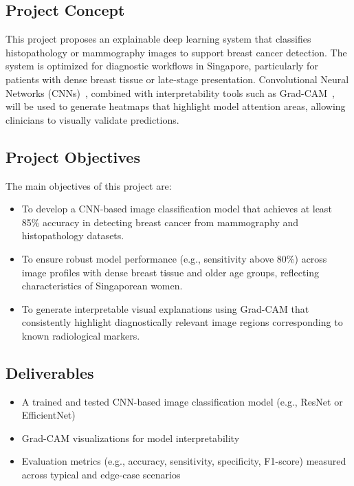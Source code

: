 \documentclass[12pt]{article}
\begin{document}
\subsection{Project Concept}
This project proposes an explainable deep learning system that classifies histopathology or mammography images to support breast cancer detection. The system is optimized for diagnostic workflows in Singapore, particularly for patients with dense breast tissue or late-stage presentation. Convolutional Neural Networks (CNNs)~\cite{17}, combined with interpretability tools such as Grad-CAM~\cite{5}, will be used to generate heatmaps that highlight model attention areas, allowing clinicians to visually validate predictions.

\subsection{Project Objectives}
\label{sec:objectives}
The main objectives of this project are:
\begin{itemize}
    \item To develop a CNN-based image classification model that achieves at least 85\% accuracy in detecting breast cancer from mammography and histopathology datasets.
    \item To ensure robust model performance (e.g., sensitivity above 80\%) across image profiles with dense breast tissue and older age groups, reflecting characteristics of Singaporean women.
    \item To generate interpretable visual explanations using Grad-CAM that consistently highlight diagnostically relevant image regions corresponding to known radiological markers.
\end{itemize}

\subsection{Deliverables}
\begin{itemize}
    \item A trained and tested CNN-based image classification model (e.g., ResNet or EfficientNet)
    \item Grad-CAM visualizations for model interpretability
    \item Evaluation metrics (e.g., accuracy, sensitivity, specificity, F1-score) measured across typical and edge-case scenarios
\end{itemize}


\newpage
\end{document}
